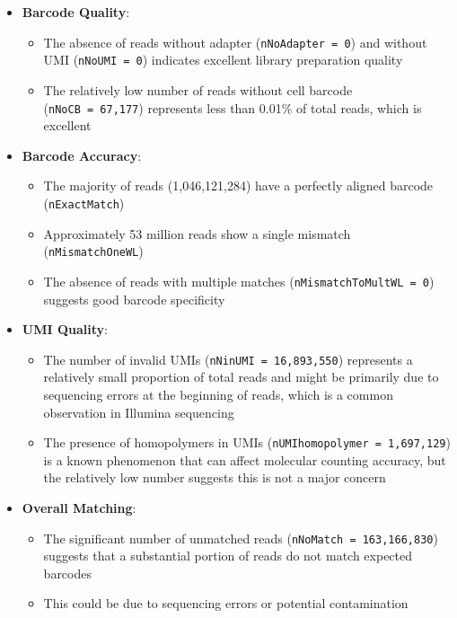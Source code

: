 \documentclass[
  11pt,
  a4paper,
]{report}
\providecommand{\tightlist}{%
  \setlength{\itemsep}{0pt}\setlength{\parskip}{0pt}}\usepackage{longtable,booktabs,array}
\begin{document}
\begin{itemize}
\tightlist
\item
  \textbf{Barcode Quality}:

  \begin{itemize}
  \tightlist
  \item
    The absence of reads without adapter (\texttt{nNoAdapter\ =\ 0}) and
    without UMI (\texttt{nNoUMI\ =\ 0}) indicates excellent library
    preparation quality
  \item
    The relatively low number of reads without cell barcode
    (\texttt{nNoCB\ =\ 67,177}) represents less than 0.01\% of total
    reads, which is excellent
  \end{itemize}
\item
  \textbf{Barcode Accuracy}:

  \begin{itemize}
  \tightlist
  \item
    The majority of reads (1,046,121,284) have a perfectly aligned
    barcode (\texttt{nExactMatch})
  \item
    Approximately 53 million reads show a single mismatch
    (\texttt{nMismatchOneWL})
  \item
    The absence of reads with multiple matches
    (\texttt{nMismatchToMultWL\ =\ 0}) suggests good barcode specificity
  \end{itemize}
\item
  \textbf{UMI Quality}:

  \begin{itemize}
  \tightlist
  \item
    The number of invalid UMIs (\texttt{nNinUMI\ =\ 16,893,550})
    represents a relatively small proportion of total reads and might be
    primarily due to sequencing errors at the beginning of reads, which
    is a common observation in Illumina sequencing
  \item
    The presence of homopolymers in UMIs
    (\texttt{nUMIhomopolymer\ =\ 1,697,129}) is a known phenomenon that
    can affect molecular counting accuracy, but the relatively low
    number suggests this is not a major concern
  \end{itemize}
\item
  \textbf{Overall Matching}:

  \begin{itemize}
  \tightlist
  \item
    The significant number of unmatched reads
    (\texttt{nNoMatch\ =\ 163,166,830}) suggests that a substantial
    portion of reads do not match expected barcodes
  \item
    This could be due to sequencing errors or potential contamination
  \end{itemize}
\end{itemize}
\end{document}
